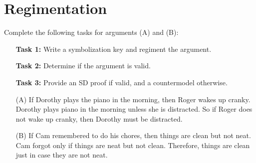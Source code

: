 \documentclass[a4paper, 11pt]{article} %
\begin{document}
\begin{enumerate}[leftmargin=1.5in]
\end{enumerate}


\section*{Regimentation}

\noindent
Complete the following tasks for arguments (A) and (B):

\begin{enumerate}
  \item[\bf Task 1:] Write a symbolization key and regiment the argument.
  \item[\bf Task 2:] Determine if the argument is valid.
  \item[\bf Task 3:] Provide an SD proof if valid, and a countermodel otherwise.
  \bigskip
  \item[(A)] If Dorothy plays the piano in the morning, then Roger wakes up cranky.
    Dorothy plays piano in the morning unless she is distracted.
    So if Roger does not wake up cranky, then Dorothy must be distracted.
  \item[(B)] If Cam remembered to do his chores, then things are clean but not neat.
    Cam forgot only if things are neat but not clean.
    Therefore, things are clean just in case they are not neat.
\end{enumerate}
\end{document}
